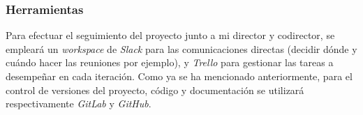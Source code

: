 \subsubsection{Herramientas}

Para efectuar el seguimiento del proyecto junto a mi director y codirector, se empleará un \textit{workspace} de \textit{Slack} para las comunicaciones directas (decidir dónde y cuándo hacer las reuniones por ejemplo), y \textit{Trello} para gestionar las tareas a desempeñar en cada iteración. Como ya se ha mencionado anteriormente, para el control de versiones del proyecto, código y documentación se utilizará respectivamente \textit{GitLab} y \textit{GitHub}.
